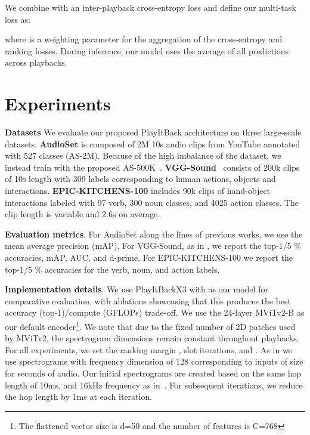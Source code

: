 \documentclass{article}
\begin{document}
We combine  with an inter-playback cross-entropy loss  and define our multi-task loss as: 

where  is a weighting parameter for the aggregation of the cross-entropy and ranking losses. During inference, our model uses the average of all predictions across playbacks.  






\section{Experiments}
\label{sec:experiments}

\noindent
\textbf{Datasets} We evaluate our proposed PlayItBack architecture on three large-scale datasets. \textbf{AudioSet} \cite{gemmeke2017audio} is composed of 2M 10s audio clips from YouTube annotated with 527 classes (AS-2M). Because of the high imbalance of the dataset, we instead train with the proposed AS-500K~\cite{nagrani2021attention}.  \textbf{VGG-Sound}~\cite{chen2020vggsound} consists of 200k clips of 10s length with 309 labels corresponding to human actions, objects and interactions. \textbf{EPIC-KITCHENS-100} \cite{damen2022rescaling} includes 90k clips of hand-object interactions labeled with 97 verb, 300 noun classes, and 4025 action classes. The clip length is variable and 2.6s on average.

\noindent
\textbf{Evaluation metrics}. For AudioSet along the lines of previous works, we use the mean average precision (mAP). For VGG-Sound, as in \cite{kazakos2021slow}, we report the top-1/5 \% accuracies, mAP, AUC, and d-prime. For EPIC-KITCHENS-100 we report the top-1/5 \% accuracies for the verb, noun, and action labels.  

\noindent
\textbf{Implementation details}. We use PlayItBackX3 with  as our model for comparative evaluation, with ablations showcasing that this produces the best accuracy (top-1)/compute (GFLOPs) trade-off. We use the 24-layer MViTv2-B \cite{li2022mvitv2} as our default encoder\footnote{The flattened vector size is d=50 and the number of features is C=768}. We note that due to the fixed number of 2D patches used by MViTv2, the spectrogram dimensions remain constant throughout playbacks. For all experiments, we set the ranking margin ,  slot iterations, and . As in \cite{kazakos2021slow} we use spectrograms with frequency dimension of 128 corresponding to inputs of size  for  seconds of audio. Our initial spectrograms are created based on the same hop length of 10ms, and 16kHz frequency as in~\cite{kazakos2021slow,nagrani2021attention,xu2022masked}.
For subsequent iterations, we reduce the hop length by 1ms at each iteration. 
\end{document}
